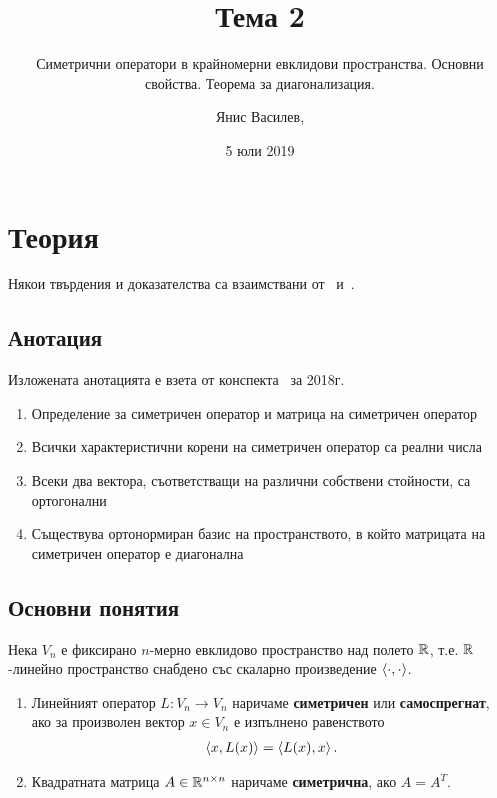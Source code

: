 \documentclass[numbers=endperiod, bibliography=totocnumbered]{scrartcl}
\title{Тема 2}
\subtitle{Симетрични оператори в крайномерни евклидови пространства. Основни свойства. Теорема за диагонализация.}
\author{Янис Василев, \Email{ianis@ivasilev.net}}
\date{5 юли 2019}
\begin{document}
\maketitle

\section{Теория}

Някои твърдения и доказателства са взаимствани от~\cite{Knapp} и~\cite{RoyachkiNotes}.

\subsection{Анотация}

Изложената анотацията е взета от конспекта~\cite{Syllabus} за 2018г.

\begin{enumerate}
  \item Определение за симетричен оператор и матрица на симетричен оператор
  \item Всички характеристични корени на симетричен оператор са реални числа
  \item Всеки два вектора, съответстващи на различни собствени стойности, са ортогонални
  \item Съществува ортонормиран базис на пространството, в който матрицата на симетричен оператор е диагонална
\end{enumerate}

\subsection{Основни понятия}

Нека \( V_n \) е фиксирано \( n \)-мерно евклидово пространство над полето \( \mathbb{R} \), т.е. \( \mathbb{R} \)-линейно пространство снабдено със скаларно произведение \( \left\langle \cdot, \cdot \right\rangle \).

\begin{definition}
  \mbox{}
  \begin{enumerate}
    \item Линейният оператор \( L: V_n \to V_n \) наричаме \textbf{симетричен} или \textbf{самоспрегнат}, ако за произволен вектор \( x \in V_n \) е изпълнено равенството
    \begin{align*}
      \left\langle x, L(x) \right\rangle = \left\langle L(x), x \right\rangle.
    \end{align*}

    \item Квадратната матрица \( A \in \mathbb{R}^{n \times n} \) наричаме \textbf{симетрична}, ако \( A = A^T \).
  \end{enumerate}
\end{definition}
\end{document}
